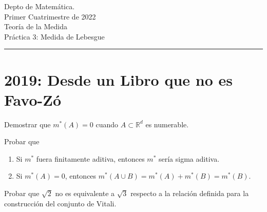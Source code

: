 \documentclass{book}
\begin{document}


\begin{large}
\begin{bfseries} %
        \noindent Depto de Matem\'atica.\\
        Primer Cuatrimestre de 2022\\                                                                                                                                                                                                                                                                                                                                                
        Teoría de la Medida \\
        Práctica 3: Medida de Lebesgue

\end{bfseries}
\end{large}
\par\noindent\rule{\textwidth}{.5pt}









\section{2019: Desde un Libro que no es Favo-Z\'o}





\begin{ejer}{}  Demostrar que  $m^*(A)=0$  cuando $A\subset\mathbb{R}^d$ es numerable.
\end{ejer}  

\begin{ejer}{} Probar que
\begin{enumerate}
\item Si $m^*$ fuera finitamente aditiva, entonces $m^*$ sería  sigma aditiva.
\item Si $m^*(A)=0$, entonces $m^*(A\cup B)=m^*(A)+m^*(B)=m^*(B)$.
\end{enumerate}
\end{ejer} 



\begin{ejer}{} Probar que $\sqrt{2}$ no es equivalente a $\sqrt{3}$ respecto a la relación definida para la construcción del conjunto de Vitali.
\end{ejer}
\end{document}
